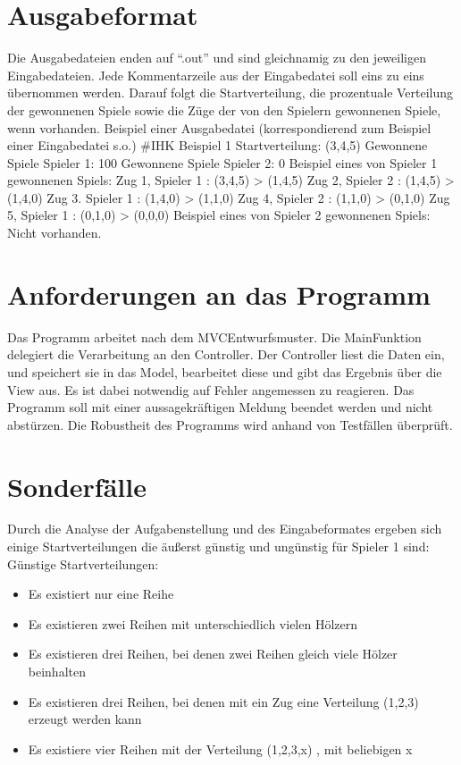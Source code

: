 \section{Ausgabeformat}
Die Ausgabedateien enden auf “.out” und sind gleichnamig zu den jeweiligen Eingabedateien.
Jede Kommentarzeile aus der Eingabedatei soll eins zu eins übernommen werden. Darauf
folgt die Startverteilung, die prozentuale Verteilung der gewonnenen Spiele sowie die Züge
der von den Spielern gewonnenen Spiele, wenn vorhanden.
Beispiel einer Ausgabedatei (korrespondierend zum Beispiel einer Eingabedatei s.o.)
\#IHK Beispiel 1
Startverteilung: (3,4,5)
Gewonnene Spiele Spieler 1: 100%
Gewonnene Spiele Spieler 2: 0%
Beispiel eines von Spieler 1 gewonnenen Spiels:
Zug 1, Spieler 1 : (3,4,5) >
(1,4,5)
Zug 2, Spieler 2 : (1,4,5) >
(1,4,0)
Zug 3. Spieler 1 : (1,4,0) >
(1,1,0)
Zug 4, Spieler 2 : (1,1,0) >
(0,1,0)
Zug 5, Spieler 1 : (0,1,0) >
(0,0,0)
Beispiel eines von Spieler 2 gewonnenen Spiels:
Nicht vorhanden.

\section{Anforderungen an das Programm}
Das Programm arbeitet nach dem MVCEntwurfsmuster.
Die MainFunktion
delegiert die
Verarbeitung an den Controller. Der Controller liest die Daten ein, und speichert sie in das
Model, bearbeitet diese und gibt das Ergebnis über die View aus.
Es ist dabei notwendig auf Fehler angemessen zu reagieren. Das Programm soll mit einer
aussagekräftigen Meldung beendet werden und nicht abstürzen. Die Robustheit des
Programms wird anhand von Testfällen überprüft.



\section{Sonderfälle}
Durch die Analyse der Aufgabenstellung und des Eingabeformates ergeben sich einige
Startverteilungen die äußerst günstig und ungünstig für Spieler 1 sind:
Günstige Startverteilungen:

\begin{itemize}
\item{Es existiert nur eine Reihe}
\item{Es existieren zwei Reihen mit unterschiedlich vielen Hölzern}
\item{Es existieren drei Reihen, bei denen zwei Reihen gleich viele Hölzer beinhalten}
\item{Es existieren drei Reihen, bei denen mit ein Zug eine Verteilung (1,2,3) erzeugt
werden kann}
\item{Es existiere vier Reihen mit der Verteilung (1,2,3,x) , mit beliebigen x}
\end{itemize}



